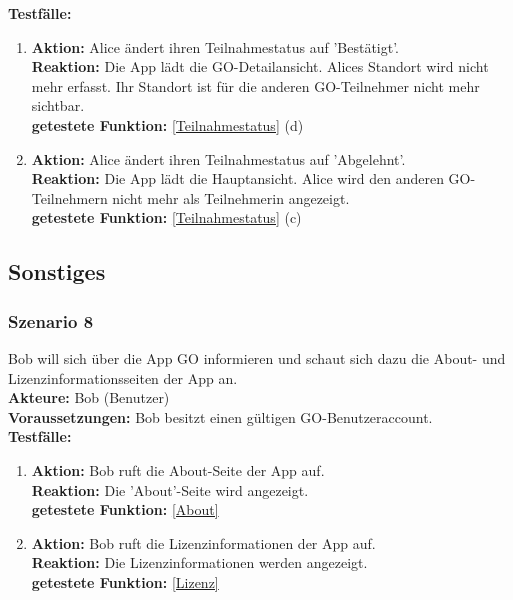 \documentclass[parskip=full]{scrartcl}
\def\threedigits#1{%
  \ifnum#1<100 0\fi
  \ifnum#1<10 0\fi
  \number#1}
\begin{document}
\textbf{Testfälle:}
\begin{enumerate}[label={\textbf{/T\protect\threedigits{\theenumi}0/}}, leftmargin=*, resume]
	\item \textbf{Aktion:} Alice ändert ihren Teilnahmestatus auf 'Bestätigt'.\\
	\textbf{Reaktion:} Die App lädt die GO-Detailansicht. Alices Standort wird nicht mehr erfasst. Ihr Standort ist für die anderen GO-Teilnehmer nicht mehr sichtbar.\\
	\textbf{getestete Funktion:} \ref{Teilnahmestatus} (d)
	\item \textbf{Aktion:} Alice ändert ihren Teilnahmestatus auf 'Abgelehnt'.\\
	\textbf{Reaktion:} Die App lädt die Hauptansicht. Alice wird den anderen GO-Teilnehmern nicht mehr als Teilnehmerin angezeigt.\\
	\textbf{getestete Funktion:} \ref{Teilnahmestatus} (c)
\end{enumerate}

\subsection{Sonstiges}

\subsubsection*{Szenario 8} Bob will sich über die App GO informieren und schaut sich dazu die About- und Lizenzinformationsseiten der App an.\\

\textbf{Akteure:} Bob (Benutzer)\\

\textbf{Voraussetzungen:} Bob besitzt einen gültigen GO-Benutzeraccount.\\

\textbf{Testfälle:}
\begin{enumerate}[label={\textbf{/T\protect\threedigits{\theenumi}0/}}, leftmargin=*, resume]
	\item \textbf{Aktion:} Bob ruft die About-Seite der App auf.\\
	\textbf{Reaktion:} Die 'About'-Seite wird angezeigt.\\
	\textbf{getestete Funktion:} \ref{About}
	\item \textbf{Aktion:} Bob ruft die Lizenzinformationen der App auf.\\
	\textbf{Reaktion: }Die Lizenzinformationen werden angezeigt.\\
	\textbf{getestete Funktion:} \ref{Lizenz}
\end{enumerate}
\end{document}
